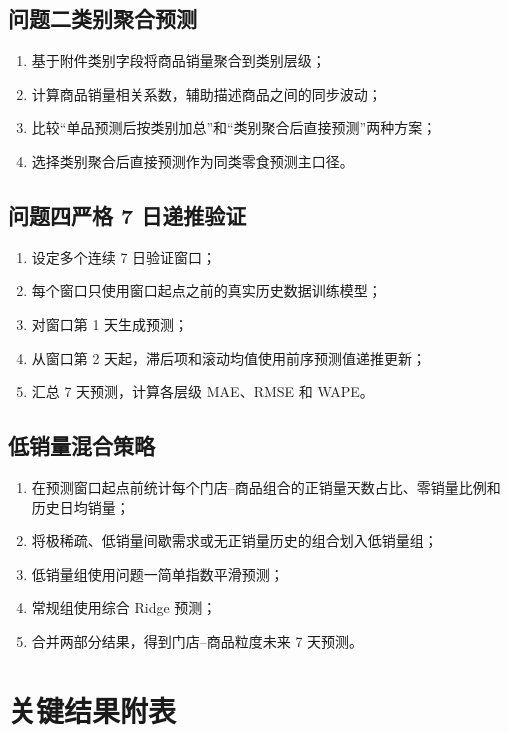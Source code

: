 \subsection{问题二类别聚合预测}
\begin{enumerate}
  \item 基于附件类别字段将商品销量聚合到类别层级；
  \item 计算商品销量相关系数，辅助描述商品之间的同步波动；
  \item 比较“单品预测后按类别加总”和“类别聚合后直接预测”两种方案；
  \item 选择类别聚合后直接预测作为同类零食预测主口径。
\end{enumerate}

\subsection{问题四严格 7 日递推验证}
\begin{enumerate}
  \item 设定多个连续 7 日验证窗口；
  \item 每个窗口只使用窗口起点之前的真实历史数据训练模型；
  \item 对窗口第 1 天生成预测；
  \item 从窗口第 2 天起，滞后项和滚动均值使用前序预测值递推更新；
  \item 汇总 7 天预测，计算各层级 MAE、RMSE 和 WAPE。
\end{enumerate}

\subsection{低销量混合策略}
\begin{enumerate}
  \item 在预测窗口起点前统计每个门店--商品组合的正销量天数占比、零销量比例和历史日均销量；
  \item 将极稀疏、低销量间歇需求或无正销量历史的组合划入低销量组；
  \item 低销量组使用问题一简单指数平滑预测；
  \item 常规组使用综合 Ridge 预测；
  \item 合并两部分结果，得到门店--商品粒度未来 7 天预测。
\end{enumerate}

\section{关键结果附表}

